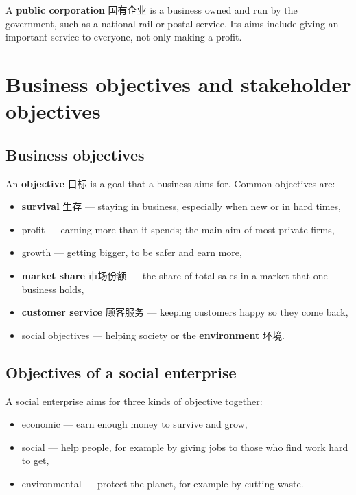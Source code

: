 \documentclass[11pt]{article}
\begin{document}
A \textbf{public corporation} 国有企业 is a business owned and run by the government, such as a national rail or postal service. Its aims include giving an important service to everyone, not only making a profit.

\section*{Business objectives and stakeholder objectives}

\subsection*{Business objectives}

An \textbf{objective} 目标 is a goal that a business aims for. Common objectives are:

\begin{itemize}
\item \textbf{survival} 生存 — staying in business, especially when new or in hard times,

\item profit — earning more than it spends; the main aim of most private firms,

\item growth — getting bigger, to be safer and earn more,

\item \textbf{market share} 市场份额 — the share of total sales in a market that one business holds,

\item \textbf{customer service} 顾客服务 — keeping customers happy so they come back,

\item social objectives — helping society or the \textbf{environment} 环境.

\end{itemize}

\subsection*{Objectives of a social enterprise}

A social enterprise aims for three kinds of objective together:

\begin{itemize}
\item economic — earn enough money to survive and grow,

\item social — help people, for example by giving jobs to those who find work hard to get,

\item environmental — protect the planet, for example by cutting waste.

\end{itemize}
\end{document}
